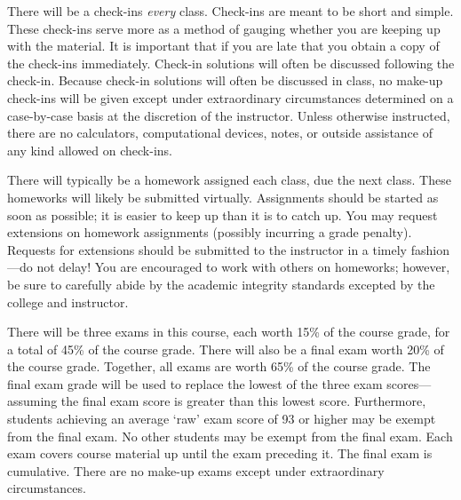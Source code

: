 \documentclass[11pt,letterpaper]{article}
\begin{document}
There will be a check-ins \textit{every} class. Check-ins are meant to be short and simple. These check-ins serve more as a method of gauging whether you are keeping up with the material. It is important that if you are late that you obtain a copy of the check-ins immediately. Check-in solutions will often be discussed following the check-in. Because check-in solutions will often be discussed in class, no make-up check-ins will be given except under extraordinary circumstances determined on a case-by-case basis at the discretion of the instructor. Unless otherwise instructed, there are no calculators, computational devices, notes, or outside assistance of any kind allowed on check-ins. \pspace


There will typically be a homework assigned each class, due the next class. These homeworks will likely be submitted virtually. Assignments should be started as soon as possible; it is easier to keep up than it is to catch up. You may request extensions on homework assignments (possibly incurring a grade penalty). Requests for extensions should be submitted to the instructor in a timely fashion---do not delay! You are encouraged to work with others on homeworks; however, be sure to carefully abide by the academic integrity standards excepted by the college and instructor. \pspace


There will be three exams in this course, each worth 15\% of the course grade, for a total of 45\% of the course grade. There will also be a final exam worth 20\% of the course grade. Together, all exams are worth 65\% of the course grade. The final exam grade will be used to replace the lowest of the three exam scores---assuming the final exam score is greater than this lowest score. Furthermore, students achieving an average `raw' exam score of 93 or higher may be exempt from the final exam. No other students may be exempt from the final exam. Each exam covers course material up until the exam preceding it. The final exam is cumulative. There are no make-up exams except under extraordinary circumstances. \pspace
\end{document}

